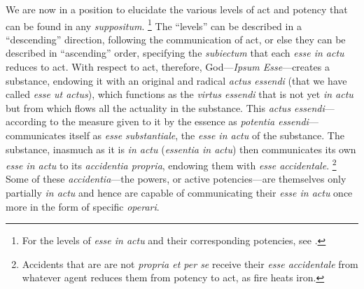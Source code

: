 We are now in a position to elucidate the various levels of act and potency that can be found in any \emph{suppositum}.%
%
\footnote{For the levels of \emph{esse in actu} and their corresponding potencies, see \cite[57–59]{contat:esse-essentia-ordo}.} The “levels” can be described in a “descending” direction, following the communication of act, or else they can be described in “ascending” order, specifying the \emph{subiectum} that each \emph{esse in actu} reduces to act. With respect to act, therefore, God—\emph{Ipsum Esse}—creates a substance, endowing it with an original and radical \emph{actus essendi} (that we have called \emph{esse ut actus}), which functions as the \emph{virtus essendi} that is not yet \emph{in actu} but from which flows all the actuality in the substance. This \emph{actus essendi}—according to the measure given to it by the essence as \emph{potentia essendi}—communicates itself as \emph{esse substantiale}, the \emph{esse in actu} of the substance. The substance, inasmuch as it is \emph{in actu} (\emph{essentia in actu}) then communicates its own \emph{esse in actu} to its \emph{accidentia propria}, endowing them with \emph{esse accidentale}.%
%
\footnote{Accidents that are are not \emph{propria et per se} receive their \emph{esse accidentale} from whatever agent reduces them from potency to act, as fire heats iron.} Some of these \emph{accidentia}—the powers, or active potencies—are themselves only partially \emph{in actu} and hence are capable of communicating their \emph{esse in actu} once more in the form of specific \emph{operari}.

